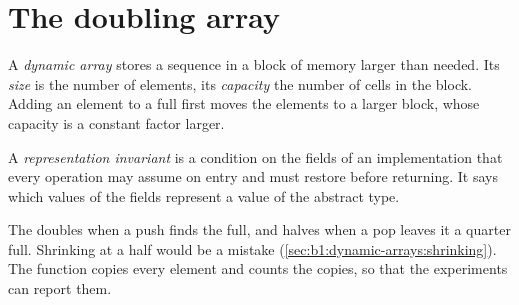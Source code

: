\label{out:b1:dynamic-arrays:swap}

\section{The doubling array}\label{sec:b1:dynamic-arrays:doubling}

\begin{definition}\label{def:b1:dynamic-arrays:dynamic-array}
A \emph{dynamic array} stores a sequence in a block of memory larger than needed. Its
\emph{size} is the number of elements, its \emph{capacity} the number of cells in the block. Adding an element to a full  first moves the elements to a larger block,
whose capacity is a constant factor larger.
\end{definition}

\begin{definition}\label{def:b1:dynamic-arrays:rep-invariant}
A \emph{representation invariant} is a condition on the fields of an implementation
that every operation may assume on entry and must restore before returning. It says which values of the fields
represent a value of the abstract type.
\end{definition}

\label{lst:b1:dynamic-arrays:vec}

The  doubles when a push finds the  full, and halves when a pop leaves it a quarter full. Shrinking at a
half would be a mistake (\cref{sec:b1:dynamic-arrays:shrinking}). The function  copies every element and
counts the copies, so that the experiments can report them.

\label{out:b1:dynamic-arrays:demo}

